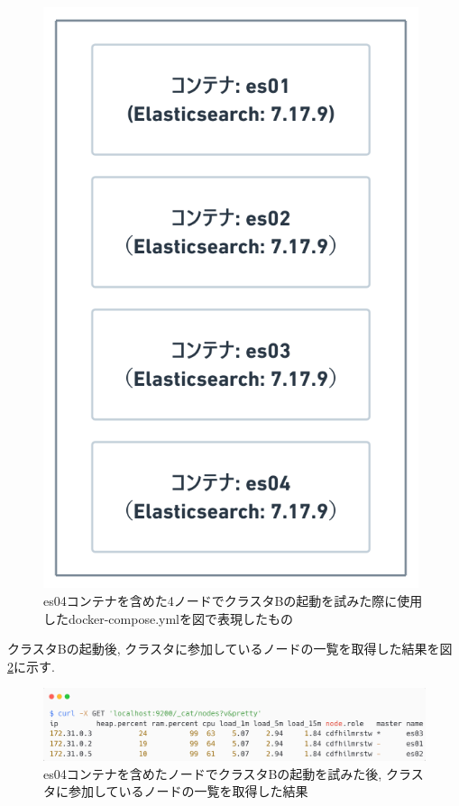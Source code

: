 \begin{figure}[H]
  \begin{center}
    \includegraphics[width=110mm]{sotu/figure/4-7.17.9.png}
    \caption{es04コンテナを含めた4ノードでクラスタBの起動を試みた際に使用したdocker-compose.ymlを図で表現したもの}
    \label{4-p13}
  \end{center}
\end{figure}

クラスタBの起動後, クラスタに参加しているノードの一覧を取得した結果を図 \ref{4-p14}に示す.

\begin{figure}[H]
  \begin{center}
    \includegraphics[width=140mm]{sotu/figure/4nodes-list.png}
    \caption{es04コンテナを含めたノードでクラスタBの起動を試みた後, クラスタに参加しているノードの一覧を取得した結果}
    \label{4-p14}
  \end{center}
\end{figure}

